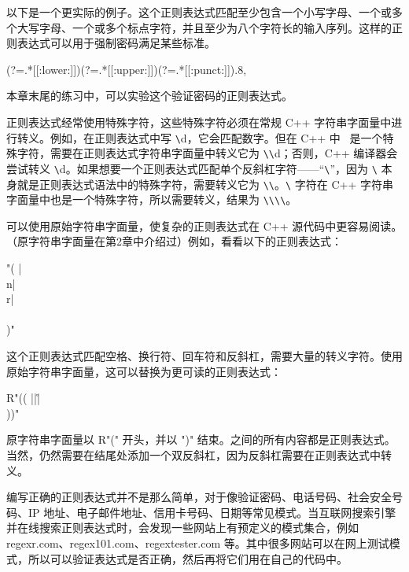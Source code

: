 以下是一个更实际的例子。这个正则表达式匹配至少包含一个小写字母、一个或多个大写字母、一个或多个标点字符，并且至少为八个字符长的输入序列。这样的正则表达式可以用于强制密码满足某些标准。

\begin{cpp}
(?=.*[[:lower:]])(?=.*[[:upper:]])(?=.*[[:punct:]]).{8,}
\end{cpp}

本章末尾的练习中，可以实验这个验证密码的正则表达式。


正则表达式经常使用特殊字符，这些特殊字符必须在常规 C++ 字符串字面量中进行转义。例如，在正则表达式中写 \verb|\|d，它会匹配数字。但在 C++ 中 \ 是一个特殊字符，需要在正则表达式字符串字面量中转义它为 \verb|\|\verb|\|d；否则，C++ 编译器会尝试转义 \verb|\|d。如果想要一个正则表达式匹配单个反斜杠字符——“\verb|\|”，因为 \verb|\| 本身就是正则表达式语法中的特殊字符，需要转义它为 \verb|\|\verb|\|。\verb|\| 字符在 C++ 字符串字面量中也是一个特殊字符，所以需要转义，结果为 \verb|\|\verb|\|\verb|\|\verb|\|。

可以使用原始字符串字面量，使复杂的正则表达式在 C++ 源代码中更容易阅读。（原字符串字面量在第2章中介绍过）例如，看看以下的正则表达式：

\begin{cpp}
"( |\\n|\\r|\\\\)"
\end{cpp}

这个正则表达式匹配空格、换行符、回车符和反斜杠，需要大量的转义字符。使用原始字符串字面量，这可以替换为更可读的正则表达式：

\begin{cpp}
R"(( |\n|\r|\\))"
\end{cpp}

原字符串字面量以 R"(" 开头，并以 ")" 结束。之间的所有内容都是正则表达式。当然，仍然需要在结尾处添加一个双反斜杠，因为反斜杠需要在正则表达式中转义。


编写正确的正则表达式并不是那么简单，对于像验证密码、电话号码、社会安全号码、IP 地址、电子邮件地址、信用卡号码、日期等常见模式。当互联网搜索引擎并在线搜索正则表达式时，会发现一些网站上有预定义的模式集合，例如 regexr.com、regex101.com、regextester.com 等。其中很多网站可以在网上测试模式，所以可以验证表达式是否正确，然后再将它们用在自己的代码中。

